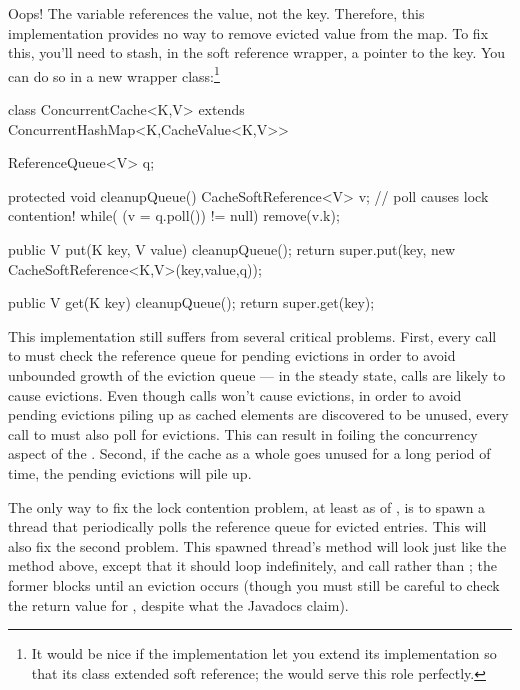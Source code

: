 Oops! The variable  references the value, not the key. Therefore, this
implementation provides no way to remove evicted value from the map. To fix
this, you'll need to stash, in the soft reference wrapper, a pointer to the key.
You can do so in a new  wrapper class:\footnote{It
would be nice if the  implementation let you extend its
implementation so that its  class extended soft reference; the
 would serve this role perfectly.}

\begin{figurelisting}
class ConcurrentCache<K,V> extends ConcurrentHashMap<K,CacheValue<K,V>> {
   ReferenceQueue<V> q;
   
   protected void cleanupQueue() {
      CacheSoftReference<V> v;
      // poll causes lock contention!
      while( (v = q.poll()) != null) {
         remove(v.k);
      }
   }
   
   public V put(K key, V value) {
      cleanupQueue();
      return super.put(key, new CacheSoftReference<K,V>(key,value,q));
   }
   
   public V get(K key) {
      cleanupQueue();
      return super.get(key);
   }
}
\end{figurelisting}
This implementation still suffers from several critical problems. First, every
call to  must check the reference queue for pending evictions in order
to avoid unbounded growth of the eviction queue --- in the steady state,
 calls are likely to cause evictions. Even though  calls
won't cause evictions, in order to avoid pending evictions piling up as cached
elements are discovered to be unused, every call to  must also poll for
evictions. This can result in foiling the concurrency aspect of the
. Second, if the cache as a whole goes unused for a long
period of time, the pending evictions will pile up.

The only way to fix the lock contention problem, at least as of \javasix, is to
spawn a thread that periodically polls the reference queue for evicted entries.
This will also fix the second problem. This spawned thread's  method
will look just like the  method above, except that it should
loop indefinitely, and call  rather than ;
the former blocks until an eviction occurs (though you must still be careful to
check the return value for , despite what the Javadocs claim).

